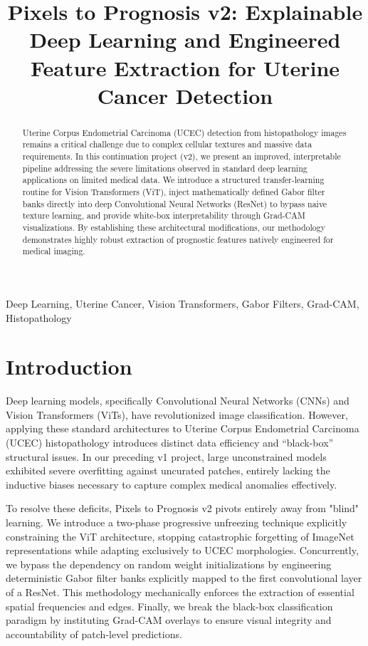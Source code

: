 \documentclass[conference]{IEEEtran}
\begin{document}
\title{Pixels to Prognosis v2: Explainable Deep Learning and Engineered Feature Extraction for Uterine Cancer Detection}

\author{
}

\maketitle

\begin{abstract}
Uterine Corpus Endometrial Carcinoma (UCEC) detection from histopathology images remains a critical challenge due to complex cellular textures and massive data requirements. In this continuation project (v2), we present an improved, interpretable pipeline addressing the severe limitations observed in standard deep learning applications on limited medical data. We introduce a structured transfer-learning routine for Vision Transformers (ViT), inject mathematically defined Gabor filter banks directly into deep Convolutional Neural Networks (ResNet) to bypass naive texture learning, and provide white-box interpretability through Grad-CAM visualizations. By establishing these architectural modifications, our methodology demonstrates highly robust extraction of prognostic features natively engineered for medical imaging.
\end{abstract}

\begin{IEEEkeywords}
Deep Learning, Uterine Cancer, Vision Transformers, Gabor Filters, Grad-CAM, Histopathology
\end{IEEEkeywords}

\section{Introduction}
Deep learning models, specifically Convolutional Neural Networks (CNNs) and Vision Transformers (ViTs), have revolutionized image classification. However, applying these standard architectures to Uterine Corpus Endometrial Carcinoma (UCEC) histopathology introduces distinct data efficiency and ``black-box'' structural issues. In our preceding v1 project, large unconstrained models exhibited severe overfitting against uncurated patches, entirely lacking the inductive biases necessary to capture complex medical anomalies effectively. 

To resolve these deficits, Pixels to Prognosis v2 pivots entirely away from "blind" learning. We introduce a two-phase progressive unfreezing technique explicitly constraining the ViT architecture, stopping catastrophic forgetting of ImageNet representations while adapting exclusively to UCEC morphologies. Concurrently, we bypass the dependency on random weight initializations by engineering deterministic Gabor filter banks explicitly mapped to the first convolutional layer of a ResNet. This methodology mechanically enforces the extraction of essential spatial frequencies and edges. Finally, we break the black-box classification paradigm by instituting Grad-CAM overlays to ensure visual integrity and accountability of patch-level predictions.
\end{document}
